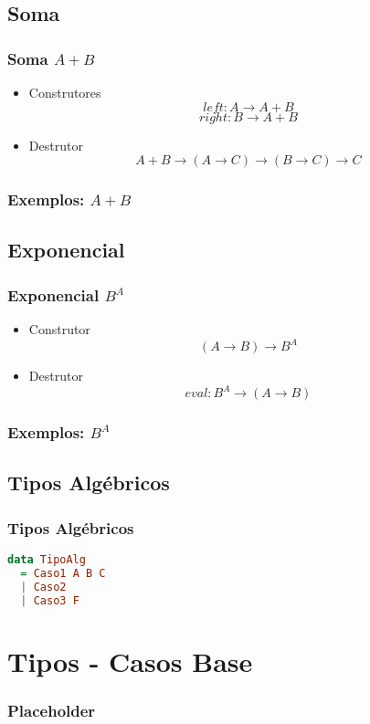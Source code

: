 \documentclass{beamer}
\begin{document}
\subsection{Soma}
\begin{frame}
    \frametitle{Soma \(A + B\)}
    \begin{itemize}
        \item Construtores
            \[
                left : A \to A + B
            \]
            \[
                right : B \to A + B
            \]
        \item Destrutor
            \[
                A + B \to (A \to C) \to (B \to C) \to C
            \]
    \end{itemize}
\end{frame}

\begin{frame}
    \frametitle{Exemplos: \(A + B\)}
\end{frame}

\subsection{Exponencial}
\begin{frame}
    \frametitle{Exponencial \(B^A\)}
    \begin{itemize}
        \item Construtor
            \[
                (A \to B) \to B^A
            \]
        \item Destrutor
            \[
                eval : B^A \to (A \to B)
            \]
    \end{itemize}
\end{frame}

\begin{frame}
    \frametitle{Exemplos: \(B^A\)}
\end{frame}

\subsection{Tipos Algébricos}
\begin{frame}[fragile]
    \frametitle{Tipos Algébricos}
    \begin{lstlisting}[language=Haskell]
data TipoAlg
  = Caso1 A B C
  | Caso2
  | Caso3 F
    \end{lstlisting}
\end{frame}

\section{Tipos - Casos Base}
\begin{frame}
    \frametitle{Placeholder}
\end{frame}
\end{document}
